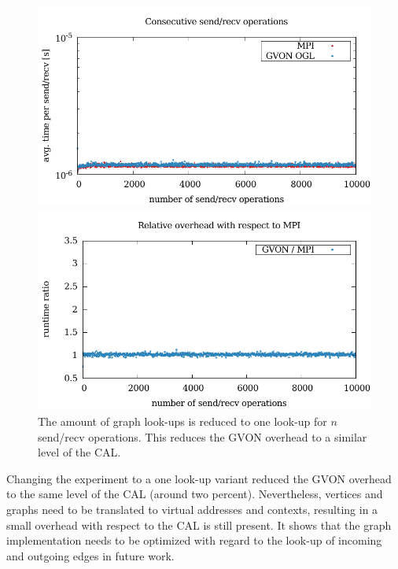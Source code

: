 \begin{figure}[H]
  \begin{minipage}[t]{0.5\textwidth} 
    \includegraphics[width=\textwidth]{plots/50_nsend_one_lookup_laser}
  \end{minipage}%
  \begin{minipage}[t]{0.5\textwidth}
    \includegraphics[width=\textwidth]{plots/50_nsend_one_lookup_overhead_gvon_laser}
  \end{minipage}%
  \caption{The amount of graph look-ups is reduced to one look-up for
    $n$ send/recv operations.  This reduces the GVON overhead to
    a similar level of the CAL.}
  \label{fig:nsend_one_lookup_kepler}
\end{figure}

\noindent Changing the experiment to a one look-up variant reduced
the GVON overhead to the same level of the CAL (around two
percent). Nevertheless, vertices and graphs need to be translated to
virtual addresses and contexts, resulting in a small overhead with
respect to the CAL is still present. It shows that the graph
implementation needs to be optimized with regard to the look-up of
incoming and outgoing edges in future work.

